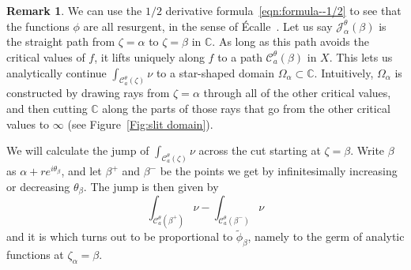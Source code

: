 \documentclass{article}
\newcommand{\C}{\mathbb{C}}
\newcommand{\series}[1]{\tilde{#1}}
\theoremstyle{definition}
\newtheorem{remark}[definition]{Remark}
\theoremstyle{plain}
\begin{document}
\begin{remark}
We can use the $1/2$ derivative formula~\eqref{eqn:formula--1/2} to see that the functions $\phi$ are all resurgent, in the sense of \'{E}calle~\cite[Section~1]{EcalleI}. Let us say $\mathcal{J}_\alpha^\theta(\beta)$ is the straight path from $\zeta = \alpha$ to $\zeta = \beta$ in $\C$. As long as this path avoids the critical values of $f$, it lifts uniquely along $f$ to a path $\mathcal{C}_a^\theta(\beta)$ in $X$. This lets us analytically continue $\int_{\mathcal{C}_a^\theta(\zeta)} \nu$ to a star-shaped domain $\Omega_\alpha \subset \C$. Intuitively, $\Omega_\alpha$ is constructed by drawing rays from $\zeta = \alpha$ through all of the other critical values, and then cutting $\C$ along the parts of those rays that go from the other critical values to $\infty$ (see Figure~\ref{Fig:slit domain}).
\begin{center}
\label{Fig:slit domain}
\end{center}


We will calculate the jump of $\int_{\mathcal{C}_a^\theta(\zeta)}\nu$ across the cut starting at $\zeta = \beta$. Write $\beta$ as $\alpha + re^{i\theta_\beta}$, and let $\beta^+$ and $\beta^-$ be the points we get by infinitesimally increasing or decreasing $\theta_\beta$. The jump is then given by \[\int_{\mathcal{C}_a^\theta(\beta^+)} \nu - \int_{\mathcal{C}_a^\theta(\beta^-)} \nu\] 
and it is 
which turns out to be proportional to $\series{\phi}_\beta$, namely to the germ of analytic functions at $\zeta_\alpha=\beta$. %



\end{remark}
\end{document}
